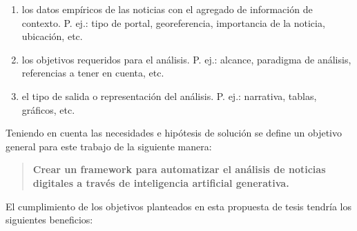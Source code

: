 \documentclass[12pt]{article}
\begin{document}
    \begin{enumerate}
        \item los datos empíricos de las noticias con el agregado de información de contexto. P. ej.:  tipo de portal, georeferencia, importancia de la noticia, ubicación, etc.
        \item los objetivos requeridos para el análisis. P. ej.: alcance, paradigma de análisis, referencias a tener en cuenta, etc.
        \item el tipo de salida o representación del análisis. P. ej.: narrativa, tablas, gráficos, etc.
    \end{enumerate}



Teniendo en cuenta las necesidades e hipótesis de solución se define un objetivo general para este trabajo de la siguiente manera: 

\begin{quote}
        \textbf{Crear un framework para automatizar el análisis de noticias digitales a través de inteligencia artificial generativa.
        }
\end{quote}

El cumplimiento de los objetivos planteados en esta propuesta de tesis tendría los siguientes beneficios:
\end{document}

